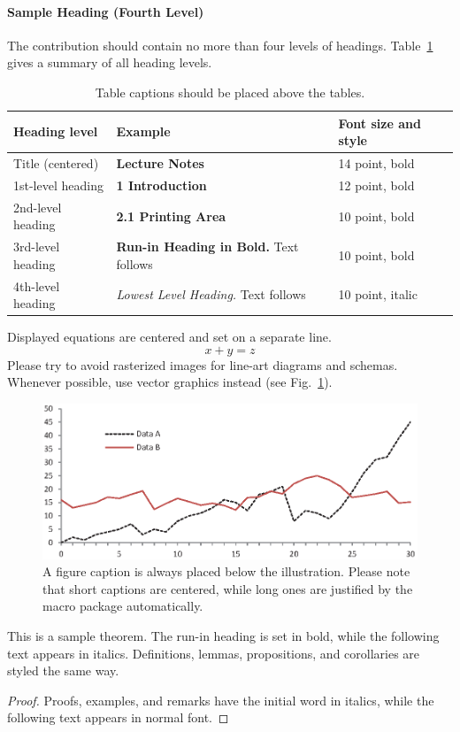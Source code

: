 \paragraph{Sample Heading (Fourth Level)}
The contribution should contain no more than four levels of
headings. Table~\ref{tab1} gives a summary of all heading levels.

\begin{table}
\caption{Table captions should be placed above the
tables.}\label{tab1}
\begin{tabular}{|l|l|l|}
\hline
Heading level &  Example & Font size and style\\
\hline
Title (centered) &  {\Large\bfseries Lecture Notes} & 14 point, bold\\
1st-level heading &  {\large\bfseries 1 Introduction} & 12 point, bold\\
2nd-level heading & {\bfseries 2.1 Printing Area} & 10 point, bold\\
3rd-level heading & {\bfseries Run-in Heading in Bold.} Text follows & 10 point, bold\\
4th-level heading & {\itshape Lowest Level Heading.} Text follows & 10 point, italic\\
\hline
\end{tabular}
\end{table}


\noindent Displayed equations are centered and set on a separate
line.
\begin{equation}
x + y = z
\end{equation}
Please try to avoid rasterized images for line-art diagrams and
schemas. Whenever possible, use vector graphics instead (see
Fig.~\ref{fig1}).

\begin{figure}
\includegraphics[width=\textwidth]{fig1.eps}
\caption{A figure caption is always placed below the illustration.
Please note that short captions are centered, while long ones are
justified by the macro package automatically.} \label{fig1}
\end{figure}

\begin{theorem}
This is a sample theorem. The run-in heading is set in bold, while
the following text appears in italics. Definitions, lemmas,
propositions, and corollaries are styled the same way.
\end{theorem}
%
%
\begin{proof}
Proofs, examples, and remarks have the initial word in italics,
while the following text appears in normal font.
\end{proof}